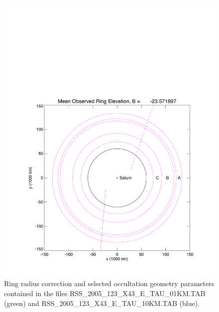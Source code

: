 \documentclass[crop=false,class=book]{standalone}
\begin{document}
\begin{figure}[H]
    \centering
    \includegraphics[page=5,trim = {0.8in 0.5in 0.21in 0.45in},clip,width=\textwidth]{Rev007_E_X43_summary_p1_08FEB2018.pdf}
	\caption[Even More Occultation Geometry]{Ring radius correction and selected occultation geometry parameters contained in the files RSS\_2005\_123\_X43\_E\_TAU\_01KM.TAB (green) and RSS\_2005\_123\_X43\_E\_TAU\_10KM.TAB (blue).}
\end{figure}
\clearpage
\end{document}
